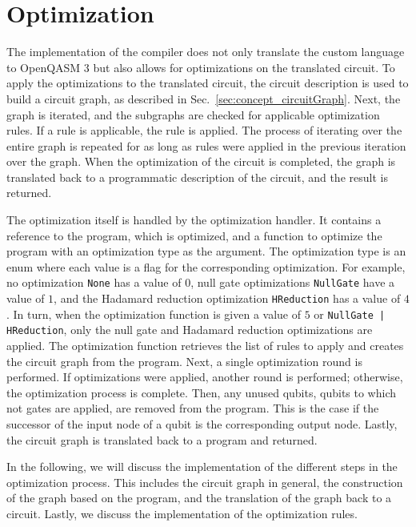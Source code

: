 \section{Optimization}
The implementation of the compiler does not only translate the custom language to OpenQASM 3 but also allows for optimizations on the translated circuit. 
To apply the optimizations to the translated circuit, the circuit description is used to build a circuit graph, as described in Sec.~\ref{sec:concept_circuitGraph}. Next, the graph is iterated, and the subgraphs are checked for applicable optimization rules. If a rule is applicable, the rule is applied. The process of iterating over the entire graph is repeated for as long as rules were applied in the previous iteration over the graph. When the optimization of the circuit is completed, the graph is translated back to a programmatic description of the circuit, and the result is returned.

The optimization itself is handled by the optimization handler. It contains a reference to the program, which is optimized, and a function to optimize the program with an optimization type as the argument. The optimization type is an enum where each value is a flag for the corresponding optimization. For example, no optimization \texttt{None} has a value of $0$, null gate optimizations \texttt{NullGate} have a value of $1$, and the Hadamard reduction optimization \texttt{HReduction} has a value of $4$. In turn, when the optimization function is given a value of $5$ or \texttt{NullGate | HReduction}, only the null gate and Hadamard reduction optimizations are applied. The optimization function retrieves the list of rules to apply and creates the circuit graph from the program. Next, a single optimization round is performed. If optimizations were applied, another round is performed; otherwise, the optimization process is complete. Then, any unused qubits, \ie qubits to which not gates are applied, are removed from the program. This is the case if the successor of the input node of a qubit is the corresponding output node. Lastly, the circuit graph is translated back to a program and returned.

In the following, we will discuss the implementation of the different steps in the optimization process. This includes the circuit graph in general, the construction of the graph based on the program, and the translation of the graph back to a circuit. Lastly, we discuss the implementation of the optimization rules.

